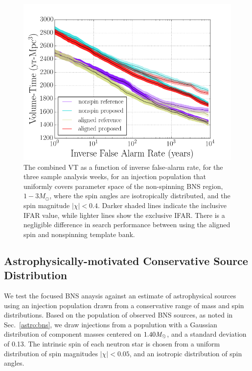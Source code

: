 \begin{figure}
\centering
\includegraphics[width=1.0\textwidth]{papers/bns_o1_dev/figures/prec_combined.png}
\caption{\label{fig:prec} 
The combined VT as a function of inverse false-alarm rate, for the
three sample analysis weeks, for an injection population that uniformly covers parameter space of the non-spinning BNS region, $1- 3M_\odot$, where
the spin angles are isotropically distributed, and the spin magnitude $|\chi| < 0.4$. Darker shaded lines indicate the inclusive IFAR value, while lighter lines show the exclusive IFAR. There is a negligible difference in search performance between using the aligned spin and nonspinning template bank.
}
\end{figure}

\subsection{Astrophysically-motivated Conservative Source Distribution}

We test the focused BNS anaysis against an estimate of astrophysical sources using an injection population drawn from a conservative range of mass and spin distributions. Based on the population of observed BNS sources, as noted in Sec.~\ref{astro:bns}, we draw injections from a populution with a Gaussian distribution of component masses centered on $1.40 \mathit{M}_\odot$, and a standard deviation of 0.13. The intrinsic spin of each neutron star is chosen from a uniform distribution of spin magnitudes $|\chi| < 0.05$, and an isotropic distribution of spin angles. 

